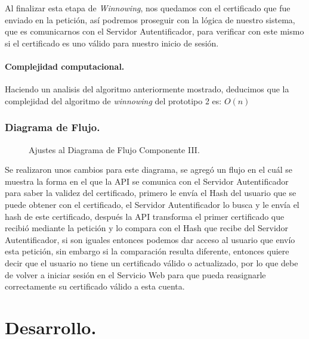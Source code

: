 \documentclass[12pt, a4paper, titlepage]{report}
\begin{document}
                Al finalizar esta etapa de \textit{Winnowing}, nos quedamos con el certificado que fue enviado en la petición, así podremos proseguir con la lógica de nuestro sistema, que es comunicarnos con el Servidor Autentificador, para verificar con este mismo si el certificado es uno válido para nuestro inicio de sesión.
                
                \subsubsection{Complejidad computacional.}
                    Haciendo un analisis del algoritmo anteriormente mostrado, deducimos que la complejidad del algoritmo de \textit{winnowing} del prototipo 2 es:
                    $O(n)$
                
	        \subsection{Diagrama de Flujo.}
	        \begin{figure}[H]
                \centering               
                \caption{Ajustes al Diagrama de Flujo Componente III.}
                \label{fig:CII_FD_PII}
            \end{figure}
            
            Se realizaron unos cambios para este diagrama, se agregó un flujo en el cuál se muestra la forma en el que la API se comunica con el Servidor Autentificador para saber la validez del certificado, primero le envía el Hash del usuario que se puede obtener con el certificado, el Servidor Autentificador lo busca y le envía el hash de este certificado, después la API transforma el primer certificado que recibió mediante la petición y lo compara con el Hash que recibe del Servidor Autentificador, si son iguales entonces podemos dar acceso al usuario que envío esta petición, sin embargo si la comparación resulta diferente, entonces quiere decir que el usuario no tiene un certificado válido o actualizado, por lo que debe de volver a iniciar sesión en el Servicio Web para que pueda reasignarle correctamente su certificado válido a esta cuenta.
	\chapter{\textcolor{azulescom}{Desarrollo.}}
	
\end{document}
